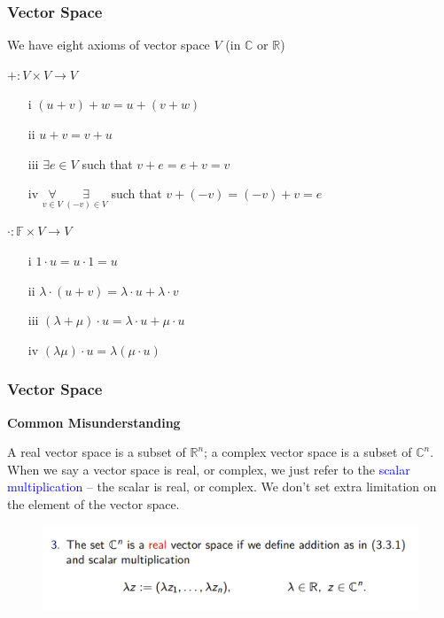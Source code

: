 \documentclass{beamer}
\begin{document}
\begin{frame}
    \frametitle{Vector Space}

We have eight axioms of vector space $V$ (in $\mathbb{C}$ or $\mathbb{R}$)\\

\begin{center}
     $+:V\times V\rightarrow V$
\end{center}

\begin{enumerate}
    \item[i]    $(u+v)+w=u+(v+w)$
    \item[ii]   $u+v=v+u$
    \item[iii]  $\exists e\in V$ such that $v+e=e+v=v$
    \item[iv]   $\underset{v\in V}{\forall}\ \underset{(-v)\in V}{\exists}$ such that $v+(-v)=(-v)+v=e$
\end{enumerate}

\begin{center}
     $\cdot:\mathbb{F}\times V\rightarrow V$
\end{center}

\begin{enumerate}
    \item[i]    $1\cdot u=u\cdot 1=u$
    \item[ii]   $\lambda\cdot(u+v)=\lambda\cdot u+\lambda\cdot v$
    \item[iii]  $(\lambda+\mu)\cdot u=\lambda\cdot u+\mu\cdot u$
    \item[iv]   $(\lambda\mu)\cdot u=\lambda(\mu\cdot u)$
\end{enumerate}

\end{frame}
\begin{frame}
    \frametitle{Vector Space}
\begin{center}
    \center \textbf{Common Misunderstanding}
\end{center}
\vspace{1em} 
A real vector space is a subset of $\mathbb{R}^n$; a complex vector space is a subset of $\mathbb{C}^n$.\\
\vspace{1em}
\hspace{1em}
When we say a vector space is real, or complex, we just refer to the \textcolor{blue}{scalar multiplication} – the scalar is real, or complex. We don’t set extra limitation on the element of the vector space.
\begin{figure}
    \centering
    \includegraphics[width=1\textwidth]{real-vec.png}
\end{figure}
\end{frame}
\end{document}
